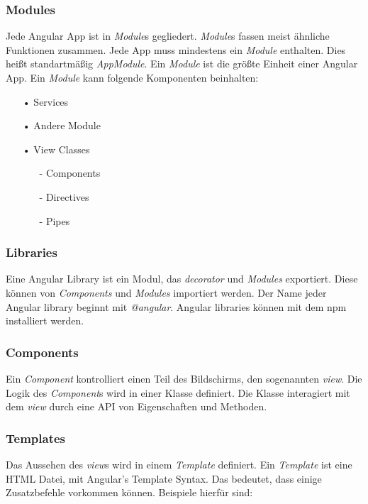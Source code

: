 \subsubsection{Modules}
\label{sec:ang-modules}
Jede Angular App ist in \textit{Module}s gegliedert. \textit{Module}s fassen meist ähnliche Funktionen zusammen. Jede App muss mindestens ein \textit{Module} enthalten. Dies heißt standartmäßig \textit{AppModule}. Ein \textit{Module} ist die größte Einheit einer Angular App.  Ein \textit{Module} kann folgende Komponenten beinhalten:

\begin{itemize}
\item[•]Services
\item[•]Andere Module
\item[•]View Classes
\begin{itemize}
\item[-]Components
\item[-]Directives
\item[-]Pipes
\end{itemize}
\end{itemize}

\subsubsection{Libraries}
\label{sec:ang-libraries}
Eine Angular Library ist ein Modul, das \textit{decorator} und \textit{Modules} exportiert. Diese können von \textit{Components} und \textit{Modules} importiert werden. Der Name jeder Angular library beginnt mit \textit{@angular}. Angular libraries können mit dem \ac{npm} installiert werden.

\subsubsection{Components}
\label{sec:ang-components}
Ein \textit{Component} kontrolliert einen Teil des Bildschirms, den sogenannten \textit{view}. Die Logik des \textit{Component}s wird in einer Klasse definiert. Die Klasse interagiert mit dem \textit{view} durch eine \ac{API} von Eigenschaften und Methoden.

\subsubsection{Templates}
\label{sec:ang-templates}
Das Aussehen des \textit{view}s wird in einem \textit{Template} definiert. Ein \textit{Template} ist eine \ac{HTML} Datei, mit Angular's Template Syntax. Das bedeutet, dass einige Zusatzbefehle vorkommen können. Beispiele hierfür sind:

